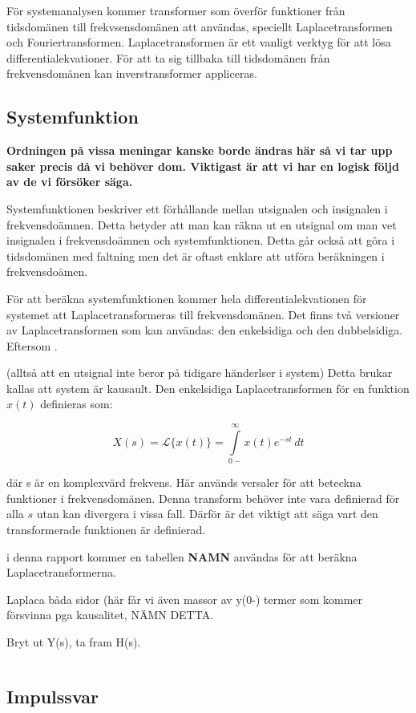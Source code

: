 För systemanalysen kommer transformer som överför funktioner från tidsdomänen till frekvsensdomänen att användas, speciellt Laplacetransformen och Fouriertransformen.
Laplacetransformen är ett vanligt verktyg för att lösa differentialekvationer. För att ta sig tillbaka till tidsdomänen från frekvensdomänen kan inverstransformer appliceras.

\subsection{Systemfunktion}
\textbf{Ordningen på vissa meningar kanske borde ändras här så vi tar upp saker precis då vi behöver dom. Viktigast är att vi har en logisk följd av de vi försöker säga.}

Systemfunktionen beskriver ett förhållande mellan utsignalen och insignalen i frekvensdoämnen. Detta betyder att man kan räkna ut en utsignal om man vet insignalen i frekvensdoämnen och systemfunktionen. 
Detta går också att göra i tidsdomänen med faltning men det är oftast enklare att utföra beräkningen i frekvensdoämen.

För att beräkna systemfunktionen kommer hela differentialekvationen för systemet att Laplacetransformeras till frekvensdomänen. Det finns två versioner av Laplacetransformen som kan användas: den enkelsidiga och den dubbelsidiga.
Eftersom .

(alltså att en utsignal inte beror på tidigare händerlser i system) Detta brukar kallas att system är kausault.
Den enkelsidiga Laplacetransformen för en funktion $x(t)$ definieras som:

$$X(s) = \mathcal{L}\big\{x(t)\big\} = \int\limits_{0-}^{\infty} x(t)e^{-st}\,dt$$

där s är en komplexvärd frekvens.
Här används versaler för att beteckna funktioner i frekvensdomänen.
Denna transform behöver inte vara definierad för alla $s$ utan kan divergera i vissa fall. Därför är det viktigt att säga vart den transformerade funktionen är definierad. 



i denna rapport kommer en tabellen \textbf{NAMN} användas för att beräkna Laplacetransformerna.

Laplaca båda sidor (här får vi även massor av y(0-) termer som kommer försvinna pga kausalitet, NÄMN DETTA.

Bryt ut Y(s), ta fram H(s).

$$$$

\subsection{Impulssvar}


